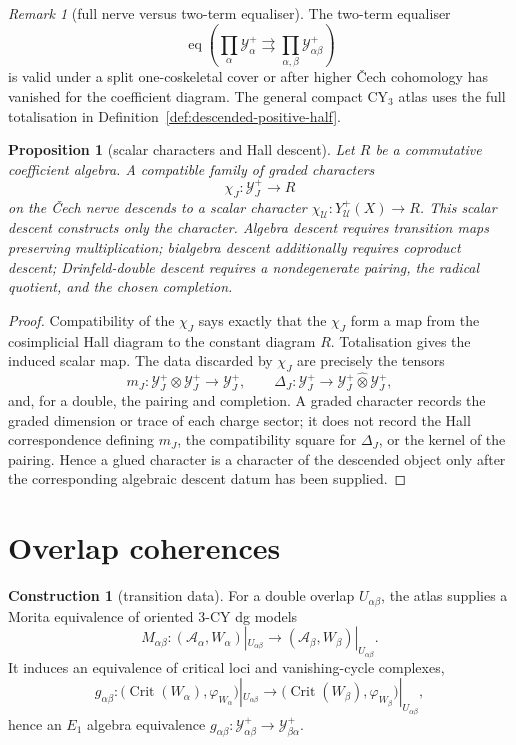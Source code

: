 \documentclass[11pt]{article}
\providecommand{\cA}{\mathcal{A}}
\providecommand{\cU}{\mathcal{U}}
\providecommand{\cY}{\mathcal{Y}}
\providecommand{\Crit}{\operatorname{Crit}}
\newtheorem{proposition}[theorem]{Proposition}
\theoremstyle{definition}
\newtheorem{construction}[theorem]{Construction}
\theoremstyle{remark}
\newtheorem{remark}[theorem]{Remark}
\begin{document}
\begin{remark}[full nerve versus two-term equaliser]\label{rem:full-nerve}
The two-term equaliser
\[
\operatorname{eq}\!\left(
\prod_{\alpha}\cY^+_{\alpha}
\rightrightarrows
\prod_{\alpha,\beta}\cY^+_{\alpha\beta}
\right)
\]
is valid under a split one-coskeletal cover or after higher
\v{C}ech cohomology has vanished for the coefficient diagram. The
general compact CY$_3$ atlas uses the full totalisation in
Definition~\ref{def:descended-positive-half}.
\end{remark}

\begin{proposition}[scalar characters and Hall descent]\label{prop:character-vs-algebra-descent}
Let $R$ be a commutative coefficient algebra. A compatible family of
graded characters
\[
\chi_J\colon \cY^+_J\longrightarrow R
\]
on the \v{C}ech nerve descends to a scalar character
$\chi_{\cU}\colon Y^+_{\cU}(X)\to R$. This scalar descent constructs
only the character. Algebra descent requires transition maps preserving
multiplication; bialgebra descent additionally requires coproduct
descent; Drinfeld-double descent requires a nondegenerate pairing, the
radical quotient, and the chosen completion.
\end{proposition}

\begin{proof}
Compatibility of the $\chi_J$ says exactly that the $\chi_J$ form a
map from the cosimplicial Hall diagram to the constant diagram $R$.
Totalisation gives the induced scalar map. The data discarded by
$\chi_J$ are precisely the tensors
\[
m_J\colon \cY^+_J\otimes\cY^+_J\to\cY^+_J,\qquad
\Delta_J\colon \cY^+_J\to\cY^+_J\widehat{\otimes}\cY^+_J,
\]
and, for a double, the pairing and completion. A graded character
records the graded dimension or trace of each charge sector; it does
not record the Hall correspondence defining $m_J$, the compatibility
square for $\Delta_J$, or the kernel of the pairing. Hence a glued
character is a character of the descended object only after the
corresponding algebraic descent datum has been supplied.
\end{proof}

\section{Overlap coherences}

\begin{construction}[transition data]\label{cstr:transition-data}
For a double overlap $U_{\alpha\beta}$, the atlas supplies a Morita
equivalence of oriented $3$-CY dg models
\[
M_{\alpha\beta}\colon
(\cA_\alpha,W_\alpha)|_{U_{\alpha\beta}}
\longrightarrow
(\cA_\beta,W_\beta)|_{U_{\alpha\beta}}.
\]
It induces an equivalence of critical loci and vanishing-cycle complexes,
\[
g_{\alpha\beta}\colon
\bigl(\Crit(W_\alpha),\varphi_{W_\alpha}\bigr)|_{U_{\alpha\beta}}
\longrightarrow
\bigl(\Crit(W_\beta),\varphi_{W_\beta}\bigr)|_{U_{\alpha\beta}},
\]
hence an $E_1$ algebra equivalence
$g_{\alpha\beta}\colon\cY^+_{\alpha\beta}\to\cY^+_{\beta\alpha}$.
\end{construction}
\end{document}
